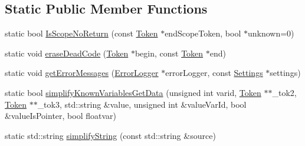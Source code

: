 \subsection*{Static Public Member Functions}
\begin{DoxyCompactItemize}
\item 
static bool \hyperlink{class_tokenizer_a16e6e5df07cba250c4784196dab9b02b}{Is\-Scope\-No\-Return} (const \hyperlink{class_token}{Token} $\ast$end\-Scope\-Token, bool $\ast$unknown=0)
\item 
static void \hyperlink{class_tokenizer_a6d10625d0964c09660922c4daa747139}{erase\-Dead\-Code} (\hyperlink{class_token}{Token} $\ast$begin, const \hyperlink{class_token}{Token} $\ast$end)
\item 
static void \hyperlink{class_tokenizer_af787c3b38d5a5f3f7ac21d30ccadffb1}{get\-Error\-Messages} (\hyperlink{class_error_logger}{Error\-Logger} $\ast$error\-Logger, const \hyperlink{class_settings}{Settings} $\ast$settings)
\item 
static bool \hyperlink{class_tokenizer_a31f3ce7fe16a4a368d19ba2059762284}{simplify\-Known\-Variables\-Get\-Data} (unsigned int varid, \hyperlink{class_token}{Token} $\ast$$\ast$\-\_\-tok2, \hyperlink{class_token}{Token} $\ast$$\ast$\-\_\-tok3, std\-::string \&value, unsigned int \&value\-Var\-Id, bool \&value\-Is\-Pointer, bool floatvar)
\item 
static std\-::string \hyperlink{class_tokenizer_a437d19231a3d3d574c4c1126c984523e}{simplify\-String} (const std\-::string \&source)
\end{DoxyCompactItemize}
